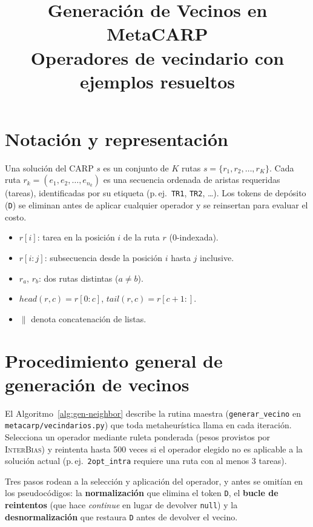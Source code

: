 \documentclass[12pt, a4paper]{article}
\title{Generación de Vecinos en MetaCARP\\
       \large Operadores de vecindario con ejemplos resueltos}
\author{}
\date{}
\begin{document}
\maketitle
\tableofcontents
\newpage

\section{Notación y representación}

Una solución del CARP $s$ es un conjunto de $K$ rutas
$s = \{r_1, r_2, \ldots, r_K\}$.
Cada ruta $r_k = (e_1, e_2, \ldots, e_{n_k})$ es una secuencia ordenada de
aristas requeridas (tareas), identificadas por su etiqueta (p.\,ej.\
\texttt{TR1}, \texttt{TR2}, \dots).  Los tokens de depósito (\texttt{D}) se
eliminan antes de aplicar cualquier operador y se reinsertan para evaluar
el costo.

\begin{itemize}
    \item $r[i]$: tarea en la posición $i$ de la ruta $r$ (0-indexada).
    \item $r[i{:}j]$: subsecuencia desde la posición $i$ hasta $j$ inclusive.
    \item $r_a$, $r_b$: dos rutas distintas ($a \neq b$).
    \item $\mathit{head}(r, c) = r[0{:}c]$, $\mathit{tail}(r, c) = r[c{+}1{:}]$.
    \item $\|$ denota concatenación de listas.
\end{itemize}

\section{Procedimiento general de generación de vecinos}

El Algoritmo~\ref{alg:gen-neighbor} describe la rutina maestra
(\texttt{generar\_vecino} en \texttt{metacarp/vecindarios.py}) que toda
metaheurística llama en cada iteración.  Selecciona un operador mediante
ruleta ponderada (pesos provistos por \textsc{InterBias}) y reintenta hasta
500 veces si el operador elegido no es aplicable a la solución actual
(p.\,ej.\ \texttt{2opt\_intra} requiere una ruta con al menos 3 tareas).

Tres pasos rodean a la selección y aplicación del operador, y antes se
omitían en los pseudocódigos: la \textbf{normalización} que elimina el
token \texttt{D}, el \textbf{bucle de reintentos} (que hace \emph{continue}
en lugar de devolver \texttt{null}) y la \textbf{desnormalización} que
restaura \texttt{D} antes de devolver el vecino.
\end{document}

